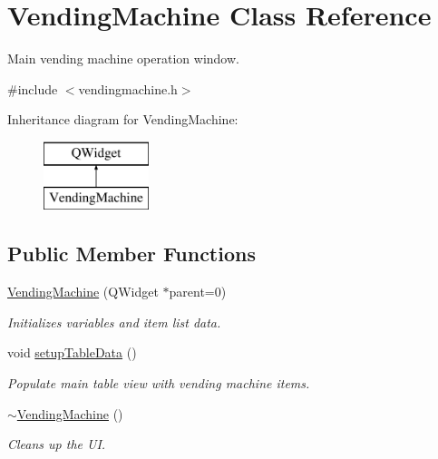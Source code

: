 \hypertarget{class_vending_machine}{\section{Vending\-Machine Class Reference}
\label{class_vending_machine}
}


Main vending machine operation window.  




{\ttfamily \#include $<$vendingmachine.\-h$>$}

Inheritance diagram for Vending\-Machine\-:\begin{figure}[H]
\begin{center}
\leavevmode
\includegraphics[height=2.000000cm]{class_vending_machine}
\end{center}
\end{figure}
\subsection*{Public Member Functions}
\begin{DoxyCompactItemize}
\item 
\hyperlink{class_vending_machine_adf0fe882700b06fd0fc150da4123658d}{Vending\-Machine} (Q\-Widget $\ast$parent=0)
\begin{DoxyCompactList}\small\item\em Initializes variables and item list data. \end{DoxyCompactList}\item 
\hypertarget{class_vending_machine_a909d274db7a9eb3c476115ad1278b8f4}{void \hyperlink{class_vending_machine_a909d274db7a9eb3c476115ad1278b8f4}{setup\-Table\-Data} ()}\label{class_vending_machine_a909d274db7a9eb3c476115ad1278b8f4}

\begin{DoxyCompactList}\small\item\em Populate main table view with vending machine items. \end{DoxyCompactList}\item 
\hypertarget{class_vending_machine_a72c4f26623cc8fcaee64d453cf81b2a6}{\hyperlink{class_vending_machine_a72c4f26623cc8fcaee64d453cf81b2a6}{$\sim$\-Vending\-Machine} ()}\label{class_vending_machine_a72c4f26623cc8fcaee64d453cf81b2a6}

\begin{DoxyCompactList}\small\item\em Cleans up the U\-I. \end{DoxyCompactList}\end{DoxyCompactItemize}


